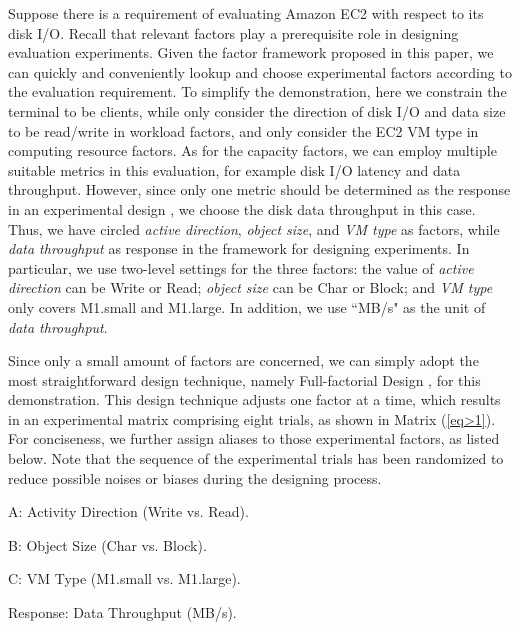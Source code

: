 \documentclass[10pt, conference, compsocconf]{IEEEtran}
\begin{document}
Suppose there is a requirement of evaluating Amazon EC2 with respect to its disk I/O. Recall that relevant factors play a prerequisite role in designing evaluation experiments. Given the factor framework proposed in this paper, we can quickly and conveniently lookup and choose experimental factors according to the evaluation requirement. To simplify the demonstration, here we constrain the terminal to be clients, while only consider the direction of disk I/O and data size to be read/write in workload factors, and only consider the EC2 VM type in computing resource factors. As for the capacity factors, we can employ multiple suitable metrics in this evaluation, for example disk I/O latency and data throughput. However, since only one metric should be determined as the response in an experimental design \cite{Antony_2003}, we choose the disk data throughput in this case. Thus, we have circled \textit{active direction}, \textit{object size}, and \textit{VM type} as factors, while \textit{data throughput} as response in the framework for designing experiments. In particular, we use two-level settings for the three factors: the value of \textit{active direction} can be Write or Read; \textit{object size} can be Char or Block; and \textit{VM type} only covers M1.small and M1.large. In addition, we use ``MB/s" as the unit of \textit{data throughput}.

Since only a small amount of factors are concerned, we can simply adopt the most straightforward design technique, namely Full-factorial Design \cite{Antony_2003}, for this demonstration. This design technique adjusts one factor at a time, which results in an experimental matrix comprising eight trials, as shown in Matrix (\ref{eq>1}). For conciseness, we further assign aliases to those experimental factors, as listed below. Note that the sequence of the experimental trials has been randomized to reduce possible noises or biases \cite{Antony_2003} during the designing process. 

\begin{itemize*}
    \item	A: Activity Direction (Write vs. Read).
    \item	B: Object Size (Char vs. Block). 
    \item	C: VM Type (M1.small vs. M1.large).
    \item	Response: Data Throughput (MB/s).
\end{itemize*}

\begin{small}
 
\end{small}
\end{document}
